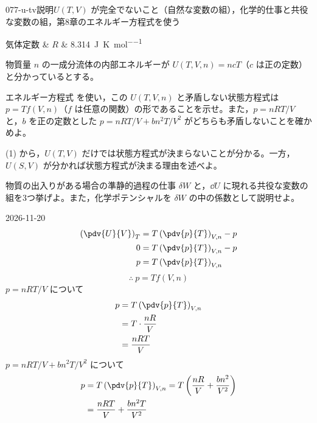\documentclass[uplatex,dvipdfmx,a4paper,11pt]{jsarticle}
\begin{document}
\begin{mondai}{077-u-tv}{説明}{$U(T,V)$ が完全でないこと（自然な変数の組），化学的仕事と共役な変数の組，第8章のエネルギー方程式を使う}
\begin{teisuu}
  気体定数 & $R$ & \qty{8.314}{\joule\per\kelvin\per\mole}\\
\end{teisuu}
物質量 $n$ の一成分流体の内部エネルギーが $U(T,V,n) = ncT$（$c$ は正の定数）と分かっているとする。
  \begin{shoumon}
    \item エネルギー方程式  を使い，この $U(T,V,n)$ と矛盾しない状態方程式は $p = Tf(V,n)$（$f$ は任意の関数）の形であることを示せ。また，$p = nRT/V$ と，$b$ を正の定数とした $p = nRT/V + bn^{2}T/V^{2}$ がどちらも矛盾しないことを確かめよ。
    \item (1) から，$U(T,V)$ だけでは状態方程式が決まらないことが分かる。一方，$U(S,V)$ が分かれば状態方程式が決まる理由を述べよ。
    \item 物質の出入りがある場合の準静的過程の仕事 $\delta W$ と，$\dd U$ に現れる共役な変数の組を3つ挙げよ。また，化学ポテンシャルを $\delta W$ の中の係数として説明せよ。
  \end{shoumon}
\begin{kotaeutsushi}{2026-11-20}
\begin{align*}
\left(\pdv{U}{V}\right)_{T}&=T\left(\pdv{p}{T}\right)_{V,n}-p\\
0&=T\left(\pdv{p}{T}\right)_{V,n}-p\\
p&=T\left(\pdv{p}{T}\right)_{V,n}
\end{align*}
\[ \therefore\ p=Tf(V,n) \]
$p=nRT/V$ について
\begin{align*}
p&=T\left(\pdv{p}{T}\right)_{V,n}\\
&=T\cdot\frac{nR}{V}\\
&=\frac{nRT}{V}
\end{align*}
$p=nRT/V+bn^{2}T/V^{2}$ について
\begin{align*}
p&=T\left(\pdv{p}{T}\right)_{V,n}=T\left(\frac{nR}{V}+\frac{bn^{2}}{V^{2}}\right)\\
&=\frac{nRT}{V}+\frac{bn^{2}T}{V^{2}}

\end{align*}
\end{kotaeutsushi}
\end{mondai}
\end{document}
